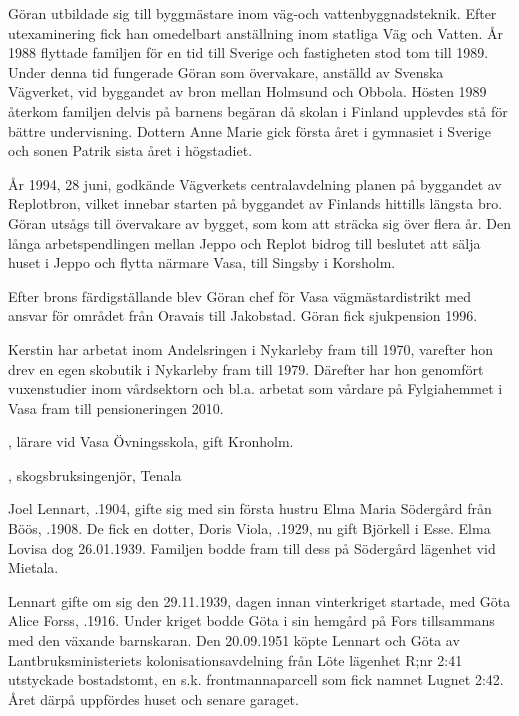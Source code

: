 Göran utbildade sig till byggmästare inom väg-och vattenbyggnadsteknik. Efter utexaminering fick han omedelbart anställning inom statliga Väg och Vatten. År 1988 flyttade familjen för en tid till Sverige och fastigheten stod tom till 1989. Under denna tid fungerade Göran som övervakare, anställd av Svenska Vägverket, vid byggandet av bron mellan Holmsund och Obbola. Hösten 1989 återkom familjen delvis på barnens begäran då skolan i Finland upplevdes stå för bättre undervisning. Dottern Anne Marie gick första året i gymnasiet i Sverige och sonen Patrik sista året i högstadiet.

År 1994, 28 juni, godkände Vägverkets centralavdelning planen på byggandet av Replotbron, vilket innebar starten på byggandet av Finlands hittills längsta bro. Göran utsågs till övervakare av bygget, som kom att sträcka sig över flera år. Den långa arbetspendlingen mellan Jeppo och Replot bidrog till beslutet att sälja huset i Jeppo och flytta närmare Vasa, till Singsby i Korsholm.

Efter brons färdigställande blev Göran chef för Vasa vägmästardistrikt med ansvar för området från Oravais till Jakobstad. Göran fick sjukpension 1996.

Kerstin har arbetat inom Andelsringen i Nykarleby fram till 1970, varefter hon drev en egen skobutik i Nykarleby fram till 1979. Därefter har hon genomfört vuxenstudier inom vårdsektorn och bl.a. arbetat som vårdare på Fylgiahemmet i Vasa fram till pensioneringen 2010.
\begin{jhchildren}
  \item {}, lärare vid Vasa Övningsskola, gift Kronholm.
  \item {}, skogsbruksingenjör, Tenala
\end{jhchildren}


Joel Lennart, .1904, gifte sig med sin första hustru Elma Maria Södergård från Böös, .1908. De fick en dotter, Doris Viola, .1929, nu gift Björkell i Esse. Elma Lovisa dog 26.01.1939. Familjen bodde fram till dess på Södergård lägenhet vid Mietala.

Lennart gifte om sig den 29.11.1939, dagen innan vinterkriget startade, med Göta Alice Forss, .1916. Under kriget bodde Göta i sin hemgård på Fors tillsammans med den växande barnskaran. Den 20.09.1951 köpte Lennart och Göta av Lantbruksministeriets kolonisationsavdelning från Löte lägenhet R;nr 2:41 utstyckade bostadstomt, en s.k. frontmannaparcell som fick namnet Lugnet 2:42. Året därpå uppfördes huset och senare garaget.

